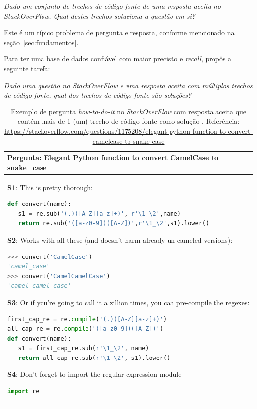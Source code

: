 \emph{Dado um conjunto de trechos de código-fonte de uma resposta aceita no StackOverFlow. Qual destes trechos soluciona a questão em si?}

Este é um típico problema de pergunta e resposta, conforme mencionado na seção~\ref{sec:fundamentos}. 

Para ter uma base de dados confiável com maior precisão e \textit{recall}, \cite{yao-2018} propôs a seguinte tarefa:

\emph{Dado uma questão no \textit{StackOverFlow} e uma resposta aceita com múltiplos trechos de código-fonte, qual dos trechos de código-fonte são soluções?}






\begin{table}[h!]
\centering
\begin{tabular}{ |p{14cm}| } 
 \hline
\textbf{Pergunta:} Elegant Python function to
convert CamelCase to snake\_case \\ \hline
\textbf{S1}: This is pretty thorough:

\begin{lstlisting}[language=python, caption={C1}]
 def convert(name):
   s1 = re.sub('(.)([A-Z][a-z]+)', r'\1_\2',name)
   return re.sub('([a-z0-9])([A-Z])',r'\1_\2',s1).lower()
\end{lstlisting}

\textbf{S2}: Works with all these (and doesn't harm already-un-cameled versions):

\begin{lstlisting}[language=python, caption={C2}]
 >>> convert('CamelCase')
'camel_case'
>>> convert('CamelCamelCase')
'camel_camel_case'
\end{lstlisting}

\textbf{S3}: Or if you're going to call it a zillion times, you can pre-compile the regexes:

\begin{lstlisting}[language=python, caption={C3}]
first_cap_re = re.compile('(.)([A-Z][a-z]+)')
all_cap_re = re.compile('([a-z0-9])([A-Z])')
def convert(name):
   s1 = first_cap_re.sub(r'\1_\2', name)
   return all_cap_re.sub(r'\1_\2', s1).lower()
\end{lstlisting}

\textbf{S4}: Don't forget to import the regular expression module
\begin{lstlisting}[language=python, caption={C4}]
import re
\end{lstlisting}

 \\ 
 \hline
\end{tabular}
\caption{Exemplo de pergunta \textit{how-to-do-it} no \textit{StackOverFlow} com resposta aceita que contém mais de 1 (um) trecho de código-fonte como solução \cite{yao-2018}. Referência: \url{https://stackoverflow.com/questions/1175208/elegant-python-function-to-convert-camelcase-to-snake-case}}
\label{table:exemplo-pergunta-stack-over-flow-how-to-do-it}
\end{table}




